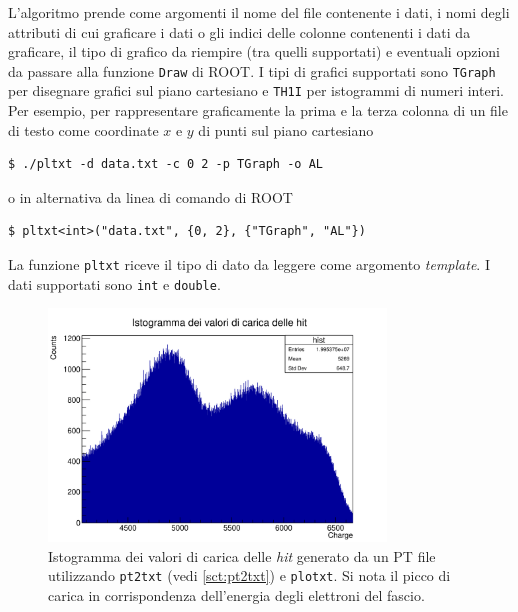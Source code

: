 \documentclass[../main.tex]{subfiles}
\begin{document}
L'algoritmo prende come argomenti il nome del file contenente i dati, i nomi degli attributi di cui graficare i dati o gli indici delle colonne contenenti i dati da graficare, il tipo di grafico da riempire (tra quelli supportati) e eventuali opzioni da passare alla funzione \texttt{Draw} di ROOT. I tipi di grafici supportati sono \texttt{TGraph} per disegnare grafici sul piano cartesiano e \texttt{TH1I} per istogrammi di numeri interi.
Per esempio, per rappresentare graficamente la prima e la terza colonna di un file di testo come coordinate $x$ e $y$ di punti sul piano cartesiano
\begin{lstlisting}[frame=none]
$ ./pltxt -d data.txt -c 0 2 -p TGraph -o AL
\end{lstlisting}
o in alternativa da linea di comando di ROOT
\begin{lstlisting}[frame=none]
$ pltxt<int>("data.txt", {0, 2}, {"TGraph", "AL"})
\end{lstlisting}
La funzione \texttt{pltxt} riceve il tipo di dato da leggere come argomento \emph{template}. I dati supportati sono \texttt{int} e \texttt{double}. 

\begin{figure}[tb]
	\centering
	\includegraphics[width=0.8\textwidth]{c1-1.png}
    \caption{Istogramma dei valori di carica delle \emph{hit} generato da un PT file utilizzando \texttt{pt2txt} (vedi \autoref{sct:pt2txt}) e \texttt{plotxt}. Si nota il picco di carica in corrispondenza dell'energia degli elettroni del fascio.}
	\label{fig:histo}
\end{figure}
\end{document}
